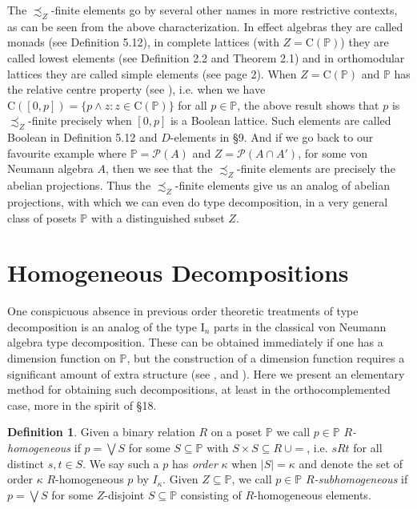 \documentclass{amsart}
\theoremstyle{definition}
\newtheorem{dfn}[dfn]{Definition}
\numberwithin{equation}{section}
\begin{document}
The $\precsim_Z$-finite elements go by several other names in more restrictive contexts, as can be seen from the above characterization.  In effect algebras they are called monads (see \cite{FoulisPulmannova2010b} Definition 5.12), in complete lattices (with $Z=\mathrm{C}(\mathbb{P})$) they are called lowest elements (see \cite{MaedaF1959} Definition 2.2 and Theorem 2.1) and in orthomodular lattices they are called simple elements (see \cite{Loomis1955} page 2).  When $Z=\mathrm{C}(\mathbb{P})$ and $\mathbb{P}$ has the relative centre property (see \cite{Chevalier1991}), i.e. when we have $\mathrm{C}([0,p])=\{p\wedge z:z\in\mathrm{C}(\mathbb{P})\}$ for all $p\in\mathbb{P}$, the above result shows that $p$ is $\precsim_Z$-finite precisely when $[0,p]$ is a Boolean lattice.  Such elements are called Boolean in \cite{FoulisPulmannova2010b} Definition 5.12 and $D$-elements in \cite{Kaplansky1955} \S9.  And if we go back to our favourite example where $\mathbb{P}=\mathcal{P}(A)$ and $Z=\mathcal{P}(A\cap A')$, for some von Neumann algebra $A$, then we see that the $\precsim_Z$-finite elements are precisely the abelian projections.  Thus the $\precsim_Z$-finite elements give us an analog of abelian projections, with which we can even do type decomposition, in a very general class of posets $\mathbb{P}$ with a distinguished subset $Z$.
















\section{Homogeneous Decompositions}\label{HD}

One conspicuous absence in previous order theoretic treatments of type decomposition is an analog of the type $\mathrm{I}_n$ parts in the classical von Neumann algebra type decomposition.  These can be obtained immediately if one has a dimension function on $\mathbb{P}$, but the construction of a dimension function requires a significant amount of extra structure (see \cite{Maeda1955}, \cite{Kalinin1976} and \cite{GoodearlWehrung2005}).  Here we present an elementary method for obtaining such decompositions, at least in the orthocomplemented case, more in the spirit of \cite{Berberian1972} \S18.

\begin{dfn}\label{homdef}
Given a binary relation $R$ on a poset $\mathbb{P}$ we call $p\in\mathbb{P}$ \emph{$R$-homogeneous} if $p=\bigvee S$ for some $S\subseteq\mathbb{P}$ with $S\times S\subseteq R\ \cup=$, i.e. $sRt$ for all distinct $s,t\in S$.  We say such a $p$ has \emph{order} $\kappa$ when $|S|=\kappa$ and denote the set of order $\kappa$ $R$-homogeneous $p$ by $I_\kappa$.  Given $Z\subseteq\mathbb{P}$, we call $p\in\mathbb{P}$ \emph{$R$-subhomogeneous} if $p=\bigvee S$ for some $Z$-disjoint $S\subseteq\mathbb{P}$ consisting of $R$-homogeneous elements.
\end{dfn}
\end{document}
